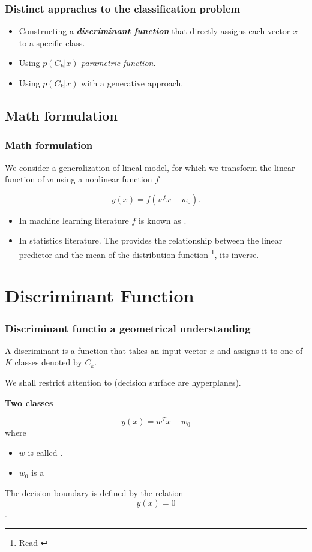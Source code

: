 \begin{frame}
    \frametitle{Distinct appraches to the classification problem}

    \begin{itemize}
        \item Constructing a \textbf{\textit{discriminant function}} that directly assigns each vector $x$ to a specific class. 
        \item Using $p(C_k | x)$ \textit{parametric function}.
        \item Using $p(C_k | x)$ with a generative approach. 
    \end{itemize}
\end{frame}

\subsection{Math formulation}
\begin{frame}
    \frametitle{Math formulation}
    We consider a generalization of lineal model, for which we 
    transform the linear function of $w$ using a nonlinear function $f$

    \begin{equation}
        y(x) = f( w^t x + w_0).
    \end{equation}

\begin{itemize}
        \item In machine learning literature $f$ is known as 
        .
        \item In statistics literature. The provides the relationship between the linear predictor 
        and the mean of the distribution function \footnote{Read \cite{link_function}}, its inverse.
    \end{itemize}
\end{frame}

\section{ Discriminant Function}
\begin{frame}
    \frametitle{Discriminant functio a geometrical understanding}
    A discriminant is a function that takes an input vector $x$ and assigns it to one of $K$ classes denoted by $C_k$. 

    We shall restrict attention to (decision surface are hyperplanes). 

    \textbf{Two classes }

    \begin{equation}
        y(x) = w^T x + w_0
    \end{equation}
    where 
    \begin{itemize}
        \item $w$ is called . 
        \item $w_0$ is a 
    \end{itemize}
The decision boundary is defined by the relation 
\begin{equation}
    y(x) = 0
\end{equation}.  
\end{frame}

